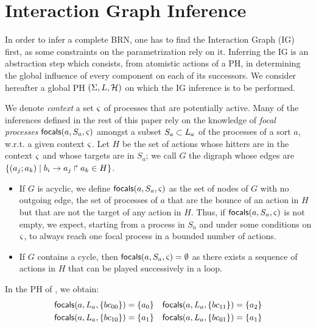 \section{Interaction Graph Inference}\label{sec:infer-IG}

In order to infer a complete BRN, one has to find the Interaction Graph (IG) first, as some constraints on the parametrization rely on it.
Inferring the IG is an abstraction step which consists, from atomistic actions of a PH, in determining the global influence of every component on each of its successors.
We consider hereafter a global PH $(\Sigma,L,\mathcal{H})$ on which the IG inference is to be performed.

We denote \emph{context} a set $\varsigma$ of processes that are potentially active.
Many of the inferences defined in the rest of this paper rely on the knowledge of \emph{focal processes} $\mathsf{focals}(a,S_a,\varsigma)$
amongst a subset $S_a \subset L_a$ of the processes of a sort $a$, w.r.t. a given context $\varsigma$.
Let $H$ be the set of actions whose hitters are in the context $\varsigma$ and whose targets are in $S_a$;
we call $G$ the digraph whose edges are $\{(a_j; a_k) \mid b_i\rightarrow a_j\Rsh a_k \in H\}$.
\begin{itemize}
  \item If $G$ is acyclic, we define $\mathsf{focals}(a,S_a,\varsigma)$ as the set of nodes of $G$ with no outgoing edge, \ie the set of processes of $a$ that are the bounce of an action in $H$ but that are not the target of any action in $H$.
Thus, if $\mathsf{focals}(a,S_a,\varsigma)$ is not empty, we expect, starting from a process in $S_a$ and under some conditions on $\varsigma$, to always reach one focal process in a bounded number of actions.
  \item If $G$ contains a cycle, then $\mathsf{focals}(a,S_a,\varsigma) = \emptyset$ as there exists a sequence of actions in $H$ that can be played successively in a loop.
\end{itemize}

\begin{example*}
In the PH of , we obtain:
\begin{align*}
\mathsf{focals}(a,L_a,\{bc_{00}\}) &= \{ a_0 \} & \mathsf{focals}(a,L_a,\{bc_{11}\}) &= \{ a_2 \} \\
\mathsf{focals}(a,L_a,\{bc_{10}\}) &= \{ a_1 \} & \mathsf{focals}(a,L_a,\{bc_{01}\}) &= \{ a_1 \}
\end{align*}
\end{example*}



